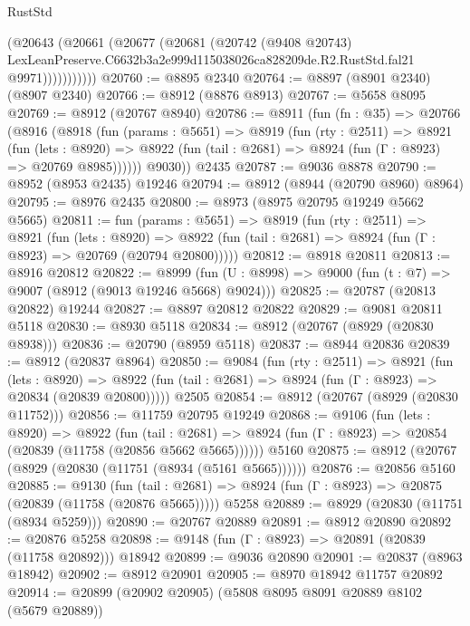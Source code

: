 \begin{lexlean}{RustStd}
\begin{coremodule}
                (@20643
                  (@20661
                    (@20677
                      (@20681
                        (@20742
                          (@9408 @20743)
                          LexLeanPreserve.C6632b3a2e999d115038026ca828209de.R2.RustStd.fal21
                          @9971)))))))))))
@20760 := @8895 @2340
@20764 := @8897 (@8901 @2340) (@8907 @2340)
@20766 := @8912 (@8876 @8913)
@20767 := @5658 @8095
@20769 := @8912 (@20767 @8940)
@20786 := @8911
    (fun (fn : @35) =>
    @20766
      (@8916
        (@8918
          (fun (params : @5651) =>
          @8919
            (fun (rty : @2511) =>
            @8921
              (fun (lets : @8920) =>
              @8922 (fun (tail : @2681) => @8924 (fun (Γ : @8923) => @20769 @8985))))))
        @9030))
    @2435
@20787 := @9036 @8878
@20790 := @8952 (@8953 @2435) @19246
@20794 := @8912 (@8944 (@20790 @8960) @8964)
@20795 := @8976 @2435
@20800 := @8973 (@8975 @20795 @19249 @5662 @5665)
@20811 := fun (params : @5651) =>
  @8919
    (fun (rty : @2511) =>
    @8921
      (fun (lets : @8920) =>
      @8922 (fun (tail : @2681) => @8924 (fun (Γ : @8923) => @20769 (@20794 @20800)))))
@20812 := @8918 @20811
@20813 := @8916 @20812
@20822 := @8999
    (fun (U : @8998) => @9000 (fun (t : @7) => @9007 (@8912 (@9013 @19246 @5668) @9024)))
@20825 := @20787 (@20813 @20822) @19244
@20827 := @8897 @20812 @20822
@20829 := @9081 @20811 @5118
@20830 := @8930 @5118
@20834 := @8912 (@20767 (@8929 (@20830 @8938)))
@20836 := @20790 (@8959 @5118)
@20837 := @8944 @20836
@20839 := @8912 (@20837 @8964)
@20850 := @9084
    (fun (rty : @2511) =>
    @8921
      (fun (lets : @8920) =>
      @8922 (fun (tail : @2681) => @8924 (fun (Γ : @8923) => @20834 (@20839 @20800)))))
    @2505
@20854 := @8912 (@20767 (@8929 (@20830 @11752)))
@20856 := @11759 @20795 @19249
@20868 := @9106
    (fun (lets : @8920) =>
    @8922
      (fun (tail : @2681) =>
      @8924 (fun (Γ : @8923) => @20854 (@20839 (@11758 (@20856 @5662 @5665))))))
    @5160
@20875 := @8912 (@20767 (@8929 (@20830 (@11751 (@8934 (@5161 @5665))))))
@20876 := @20856 @5160
@20885 := @9130
    (fun (tail : @2681) => @8924 (fun (Γ : @8923) => @20875 (@20839 (@11758 (@20876 @5665)))))
    @5258
@20889 := @8929 (@20830 (@11751 (@8934 @5259)))
@20890 := @20767 @20889
@20891 := @8912 @20890
@20892 := @20876 @5258
@20898 := @9148 (fun (Γ : @8923) => @20891 (@20839 (@11758 @20892))) @18942
@20899 := @9036 @20890
@20901 := @20837 (@8963 @18942)
@20902 := @8912 @20901
@20905 := @8970 @18942 @11757 @20892
@20914 := @20899 (@20902 @20905) (@5808 @8095 @8091 @20889 @8102 (@5679 @20889))

\end{coremodule}
\end{lexlean}
